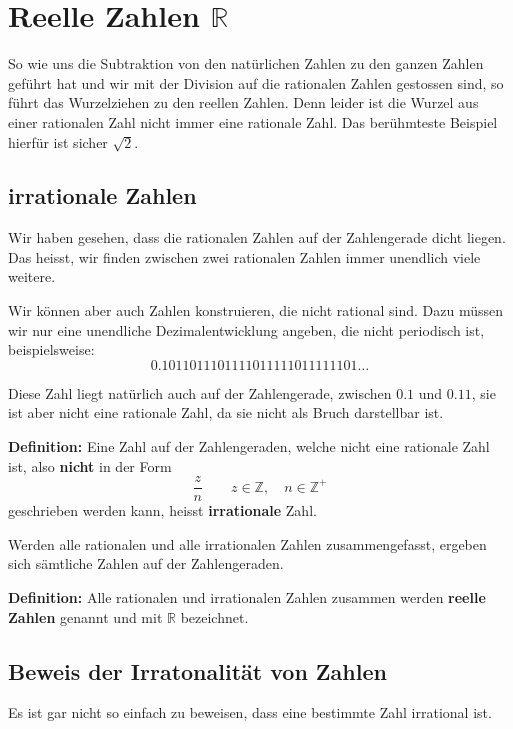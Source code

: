 \newpage
\section{Reelle Zahlen $\mathbb{R}$}

So wie uns die Subtraktion von den natürlichen Zahlen zu den ganzen Zahlen geführt hat und wir mit der Division auf die rationalen Zahlen gestossen sind, so führt das Wurzelziehen zu den reellen Zahlen. Denn leider ist die Wurzel aus einer rationalen Zahl nicht immer eine rationale Zahl. Das berühmteste Beispiel hierfür ist sicher $\sqrt{2}$.

\subsection{irrationale Zahlen}

Wir haben gesehen, dass die rationalen Zahlen auf der Zahlengerade dicht liegen. Das heisst, wir finden zwischen zwei rationalen Zahlen immer unendlich viele weitere.

Wir können aber auch Zahlen konstruieren, die nicht rational sind. Dazu müssen wir nur eine unendliche Dezimalentwicklung angeben, die nicht periodisch ist, beispielsweise:
\[
  0.1011011101111011111011111101\ldots
\]

Diese Zahl liegt natürlich auch auf der Zahlengerade, zwischen $0.1$ und $0.11$, sie ist aber nicht eine rationale Zahl, da sie nicht als Bruch darstellbar ist.

\textbf{Definition:} Eine Zahl auf der Zahlengeraden, welche nicht eine rationale Zahl ist, also \textbf{nicht} in der Form
\[
  \frac{z}{n} \qquad z \in \mathbb{Z},\quad n \in \mathbb{Z^{+}}
\]
geschrieben werden kann, heisst \textbf{irrationale} Zahl.

Werden alle rationalen und alle irrationalen Zahlen zusammengefasst, ergeben sich sämtliche Zahlen auf der Zahlengeraden.

\textbf{Definition:} Alle rationalen und irrationalen Zahlen zusammen werden \textbf{reelle Zahlen} genannt und mit $\mathbb{R}$ bezeichnet.

\subsection{Beweis der Irratonalität von Zahlen}

Es ist gar nicht so einfach zu beweisen, dass eine bestimmte Zahl irrational ist.


